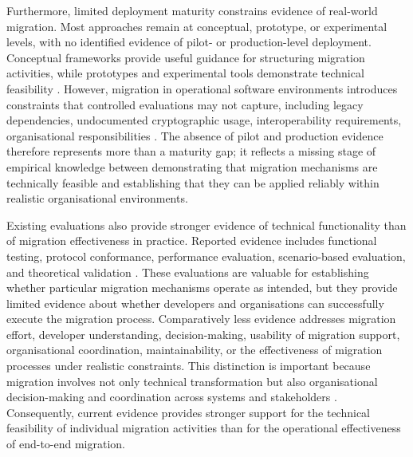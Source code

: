 \documentclass[letterpaper,twocolumn,10pt]{article}
\begin{document}
Furthermore, limited deployment maturity constrains evidence of real-world migration. Most approaches remain at conceptual, prototype, or experimental levels, with no identified evidence of pilot- or production-level deployment. Conceptual frameworks provide useful guidance for structuring migration activities, while prototypes and experimental tools demonstrate technical feasibility \cite{Ana_MigFrDepen, Ana_MigFrameOrg, Ana_PMMP, Ana_FinanceMig, Ana_ccPASTpqc, Ana_e27020212, Ana_rattanavipanon_toolchain_2025, Ana_android_Migr}. However, migration in operational software environments introduces constraints that controlled evaluations may not capture, including legacy dependencies, undocumented cryptographic usage, interoperability requirements, organisational responsibilities \cite{naether_migrating_2024, migration_Comparison}. The absence of pilot and production evidence therefore represents more than a maturity gap; it reflects a missing stage of empirical knowledge between demonstrating that migration mechanisms are technically feasible and establishing that they can be applied reliably within realistic organisational environments.

Existing evaluations also provide stronger evidence of technical functionality than of migration effectiveness in practice. Reported evidence includes functional testing, protocol conformance, performance evaluation, scenario-based evaluation, and theoretical validation \cite{Ana_rattanavipanon_toolchain_2025, Ana_ccPASTpqc, Ana_e27020212, Ana_decisionAlgo, Ana_android_Migr, Ana_MigFrameOrg, Ana_PMMP}. These evaluations are valuable for establishing whether particular migration mechanisms operate as intended, but they provide limited evidence about whether developers and organisations can successfully execute the migration process. Comparatively less evidence addresses migration effort, developer understanding, decision-making, usability of migration support, organisational coordination, maintainability, or the effectiveness of migration processes under realistic constraints. This distinction is important because migration involves not only technical transformation but also organisational decision-making and coordination across systems and stakeholders \cite{naether_migrating_2024}. Consequently, current evidence provides stronger support for the technical feasibility of individual migration activities than for the operational effectiveness of end-to-end migration.
\end{document}

